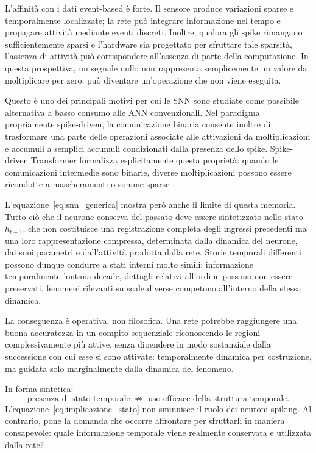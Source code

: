 L'affinità con i dati event-based è forte. Il sensore produce variazioni sparse e temporalmente localizzate; la rete può integrare informazione nel tempo e propagare attività mediante eventi discreti. Inoltre, qualora gli spike rimangano sufficientemente sparsi e l'hardware sia progettato per sfruttare tale sparsità, l'assenza di attività può corrispondere all'assenza di parte della computazione. In questa prospettiva, un segnale nullo non rappresenta semplicemente un valore da moltiplicare per zero: può diventare un'operazione che non viene eseguita.

Questo è uno dei principali motivi per cui le SNN sono studiate come possibile alternativa a basso consumo alle ANN convenzionali. Nel paradigma propriamente spike-driven, la comunicazione binaria consente inoltre di trasformare una parte delle operazioni associate alle attivazioni da moltiplicazioni e accumuli a semplici accumuli condizionati dalla presenza dello spike. Spike-driven Transformer formalizza esplicitamente questa proprietà: quando le comunicazioni intermedie sono binarie, diverse moltiplicazioni possono essere ricondotte a mascheramenti o somme sparse~\cite{yao2023spikedriven}.

L'equazione~\eqref{eq:snn_generica} mostra però anche il limite di questa memoria. Tutto ciò che il neurone conserva del passato deve essere sintetizzato nello stato $h_{t-1}$, che non costituisce una registrazione completa degli ingressi precedenti ma una loro rappresentazione compressa, determinata dalla dinamica del neurone, dai suoi parametri e dall'attività prodotta dalla rete. Storie temporali differenti possono dunque condurre a stati interni molto simili: informazione temporalmente lontana decade, dettagli relativi all'ordine possono non essere preservati, fenomeni rilevanti su scale diverse competono all'interno della stessa dinamica.

La conseguenza è operativa, non filosofica. Una rete potrebbe raggiungere una buona accuratezza in un compito sequenziale riconoscendo le regioni complessivamente più attive, senza dipendere in modo sostanziale dalla successione con cui esse si sono attivate: temporalmente dinamica per costruzione, ma guidata solo marginalmente dalla dinamica del fenomeno.

In forma sintetica:
\begin{equation}
\label{eq:implicazione_stato}
\text{presenza di stato temporale} \;\not\Rightarrow\; \text{uso efficace della struttura temporale}.
\end{equation}
L'equazione~\eqref{eq:implicazione_stato} non sminuisce il ruolo dei neuroni spiking. Al contrario, pone la domanda che occorre affrontare per sfruttarli in maniera consapevole: quale informazione temporale viene realmente conservata e utilizzata dalla rete?

